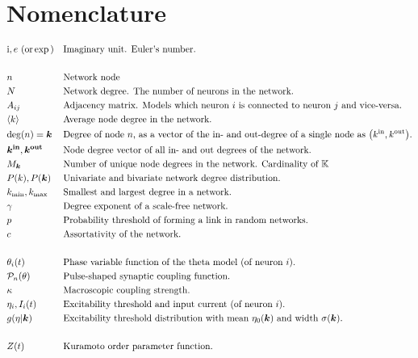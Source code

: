 \newpage
\section{Nomenclature}
\vspace{-.5cm}
\begin{alignat*}{2}
& \ic, e \text{ (or} \exp\text{)} &&\text{Imaginary unit. Euler's number.}\\ \\
& n&&\text{Network node}\\
& N &&\text{Network degree. The number of neurons in the network.}\\
& A_{ij} &&\text{Adjacency matrix. Models which neuron $i$ is connected to neuron $j$ and vice-versa.}\\
& \kmean &&\text{Average node degree in the network.}\\
& \degree(n) = \k &&\text{Degree of node $n$, as a vector of the in- and out-degree of a single node as $\left(\kin, \kout \right)$.}\\
& \kinb, \koutb && \text{Node degree vector of all in- and out degrees of the network.} \\
& M_{\k} &&\text{Number of unique node degrees in the network. Cardinality of $\K$}\\
& P(k), P(\k) &&\text{Univariate and bivariate network degree distribution.}\\
&\kmin, \kmax &&\text{Smallest and largest degree in a network.}\\ 
&\gamma &&\text{Degree exponent of a scale-free network.}\\ 
&p &&\text{Probability threshold of forming a link in random networks.}\\ 
&c &&\text{Assortativity of the network.}\\ \\
&\theta_i(t) &&\text{Phase variable function of the theta model (of neuron $i$).}\\
& \Pulse_n (\theta)&&\text{Pulse-shaped synaptic coupling function.}\\
&\kappa &&\text{Macroscopic coupling strength.}\\
&\eta_i, I_i(t) &&\text{Excitability threshold and input current (of neuron $i$).}\\
&g(\eta \rvert \k) \quad &&\text{Excitability threshold distribution with mean $\eta_0(\k)$ and width $\sigma(\k)$.}\\ \\
& Z(t) &&\text{Kuramoto order parameter function.}\\

\end{alignat*}
